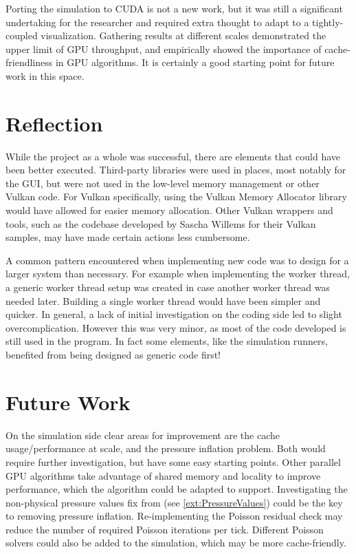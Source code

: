 Porting the simulation to CUDA is not a new work, but it was still a significant undertaking for the researcher and required extra thought to adapt to a tightly-coupled visualization.
Gathering results at different scales demonstrated the upper limit of GPU throughput, and empirically showed the importance of cache-friendliness in GPU algorithms.
It is certainly a good starting point for future work in this space.

\section{Reflection}
While the project as a whole was successful, there are elements that could have been better executed.
Third-party libraries were used in places, most notably for the GUI, but were not used in the low-level memory management or other Vulkan code.
For Vulkan specifically, using the Vulkan Memory Allocator library\cite{GPUOpenVMA} would have allowed for easier memory allocation.
Other Vulkan wrappers and tools, such as the codebase developed by Sascha Willems for their Vulkan samples\cite{SaschaWillemsVulkan}, may have made certain actions less cumbersome.

A common pattern encountered when implementing new code was to design for a larger system than necessary.
For example when implementing the worker thread, a generic worker thread setup was created in case another worker thread was needed later.
Building a single worker thread would have been simpler and quicker.
In general, a lack of initial investigation on the coding side led to slight overcomplication.
However this was very minor, as most of the code developed is still used in the program.
In fact some elements, like the simulation runners, benefited from being designed as generic code first!

\section{Future Work}

On the simulation side clear areas for improvement are the cache usage/performance at scale, and the pressure inflation problem.
Both would require further investigation, but have some easy starting points.
Other parallel GPU algorithms take advantage of shared memory and locality to improve performance, which the algorithm could be adapted to support.
Investigating the non-physical pressure values fix from \cite{book:griebel1998numerical} (see \cref{ext:PressureValues}) could be the key to removing pressure inflation.
Re-implementing the Poisson residual check may reduce the number of required Poisson iterations per tick.
Different Poisson solvers could also be added to the simulation, which may be more cache-friendly.

